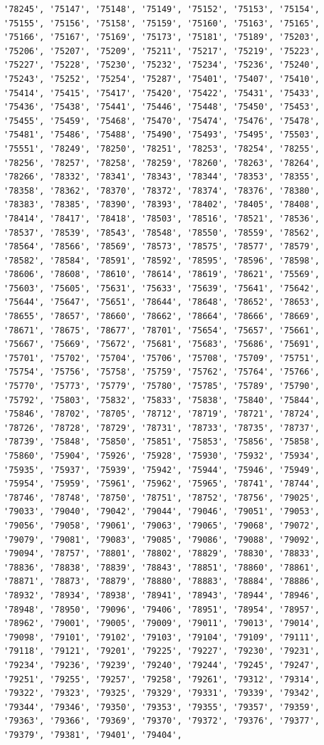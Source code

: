 \documentclass[
  letterpaper,
  DIV=11,
  numbers=noendperiod]{scrartcl}
\begin{document}
\begin{verbatim}
'78245', '75147', '75148', '75149', '75152', '75153', '75154', '75155', '75156', '75158', '75159', '75160', '75163', '75165', '75166', '75167', '75169', '75173', '75181', '75189', '75203', '75206', '75207', '75209', '75211', '75217', '75219', '75223', '75227', '75228', '75230', '75232', '75234', '75236', '75240', '75243', '75252', '75254', '75287', '75401', '75407', '75410', '75414', '75415', '75417', '75420', '75422', '75431', '75433', '75436', '75438', '75441', '75446', '75448', '75450', '75453', '75455', '75459', '75468', '75470', '75474', '75476', '75478', '75481', '75486', '75488', '75490', '75493', '75495', '75503', '75551', '78249', '78250', '78251', '78253', '78254', '78255', '78256', '78257', '78258', '78259', '78260', '78263', '78264', '78266', '78332', '78341', '78343', '78344', '78353', '78355', '78358', '78362', '78370', '78372', '78374', '78376', '78380', '78383', '78385', '78390', '78393', '78402', '78405', '78408', '78414', '78417', '78418', '78503', '78516', '78521', '78536', '78537', '78539', '78543', '78548', '78550', '78559', '78562', '78564', '78566', '78569', '78573', '78575', '78577', '78579', '78582', '78584', '78591', '78592', '78595', '78596', '78598', '78606', '78608', '78610', '78614', '78619', '78621', '75569', '75603', '75605', '75631', '75633', '75639', '75641', '75642', '75644', '75647', '75651', '78644', '78648', '78652', '78653', '78655', '78657', '78660', '78662', '78664', '78666', '78669', '78671', '78675', '78677', '78701', '75654', '75657', '75661', '75667', '75669', '75672', '75681', '75683', '75686', '75691', '75701', '75702', '75704', '75706', '75708', '75709', '75751', '75754', '75756', '75758', '75759', '75762', '75764', '75766', '75770', '75773', '75779', '75780', '75785', '75789', '75790', '75792', '75803', '75832', '75833', '75838', '75840', '75844', '75846', '78702', '78705', '78712', '78719', '78721', '78724', '78726', '78728', '78729', '78731', '78733', '78735', '78737', '78739', '75848', '75850', '75851', '75853', '75856', '75858', '75860', '75904', '75926', '75928', '75930', '75932', '75934', '75935', '75937', '75939', '75942', '75944', '75946', '75949', '75954', '75959', '75961', '75962', '75965', '78741', '78744', '78746', '78748', '78750', '78751', '78752', '78756', '79025', '79033', '79040', '79042', '79044', '79046', '79051', '79053', '79056', '79058', '79061', '79063', '79065', '79068', '79072', '79079', '79081', '79083', '79085', '79086', '79088', '79092', '79094', '78757', '78801', '78802', '78829', '78830', '78833', '78836', '78838', '78839', '78843', '78851', '78860', '78861', '78871', '78873', '78879', '78880', '78883', '78884', '78886', '78932', '78934', '78938', '78941', '78943', '78944', '78946', '78948', '78950', '79096', '79406', '78951', '78954', '78957', '78962', '79001', '79005', '79009', '79011', '79013', '79014', '79098', '79101', '79102', '79103', '79104', '79109', '79111', '79118', '79121', '79201', '79225', '79227', '79230', '79231', '79234', '79236', '79239', '79240', '79244', '79245', '79247', '79251', '79255', '79257', '79258', '79261', '79312', '79314', '79322', '79323', '79325', '79329', '79331', '79339', '79342', '79344', '79346', '79350', '79353', '79355', '79357', '79359', '79363', '79366', '79369', '79370', '79372', '79376', '79377', '79379', '79381', '79401', '79404', 
\end{verbatim}
\end{document}
